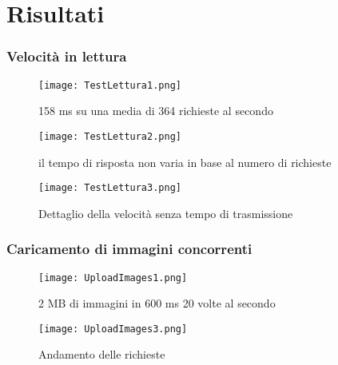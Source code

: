 
\section{Risultati}

\subsubsection{Velocità in lettura}

\begin{figure}[htbp]
    \begin{center}
        \texttt{[image: TestLettura1.png]}
        \caption{158 ms su una media di 364 richieste al secondo}
    \end{center}
\end{figure}

\begin{figure}[htbp]
    \begin{center}
        \texttt{[image: TestLettura2.png]}
        \caption{il tempo di risposta non varia in base al numero di richieste}
    \end{center}
\end{figure}

\begin{figure}[htbp]
    \begin{center}
        \texttt{[image: TestLettura3.png]}
        \caption{Dettaglio della velocità senza tempo di trasmissione}
    \end{center}
\end{figure}
\clearpage
\subsubsection{Caricamento di immagini concorrenti}

\begin{figure}[htbp]
    \begin{center}
        \texttt{[image: UploadImages1.png]}
        \caption{2 MB di immagini in 600 ms 20 volte al secondo}  
    \end{center}
\end{figure}

\begin{figure}[htbp]
    \begin{center}
        \texttt{[image: UploadImages3.png]}
        \caption{Andamento delle richieste}  
    \end{center}
\end{figure}

